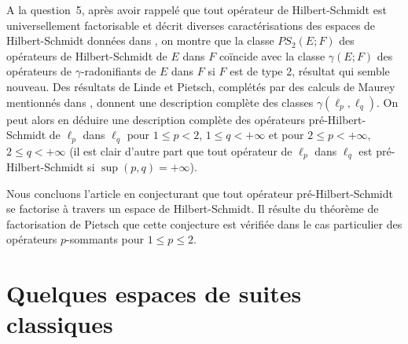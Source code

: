 \documentclass{smfart}
\theoremstyle{plain}
\theoremstyle{definition}
\begin{document}
A la question~5, après avoir rappelé que tout opérateur de
Hilbert-Schmidt est universellement factorisable et décrit diverses
caractérisations des espaces de Hilbert-Schmidt données dans
\cite{DJT}, on montre que la classe $PS_2(E;F)$ des opérateurs de
Hilbert-Schmidt de $E$ dans $F$ coïncide avec la classe
$\gamma(E;F)$ des opérateurs de $\gamma$-radonifiants de $E$ dans
$F$ si $F$ est de type 2, résultat qui semble nouveau. Des
résultats de Linde et Pietsch, complétés par des calculs de
Maurey mentionnés dans \cite{lp}, donnent une description complète
des classes $\gamma(\ell _p,\ell_q).$ On peut alors en déduire une
description complète des opérateurs pré-Hilbert-Schmidt de
$\ell_p$ dans $\ell_q$ pour $1\le p < 2$, $1 \le q <+\infty$ et pour
$2 \le p < +\infty,$ $2\le q <+\infty$ (il est clair d'autre part que
tout opérateur de $\ell_p$ dans $\ell_q$ est pré-Hilbert-Schmidt
si $\sup(p,q)=+\infty$).

Nous concluons l'article en conjecturant que tout opérateur
pré-Hilbert-Schmidt se factorise à travers un espace de
Hilbert-Schmidt. Il résulte du théorème de factorisation de
Pietsch que cette conjecture est vérifiée dans le cas particulier
des opérateurs $p$-sommants pour $1 \le p \le 2.$

















\section{Quelques espaces de suites classiques}
\end{document}
